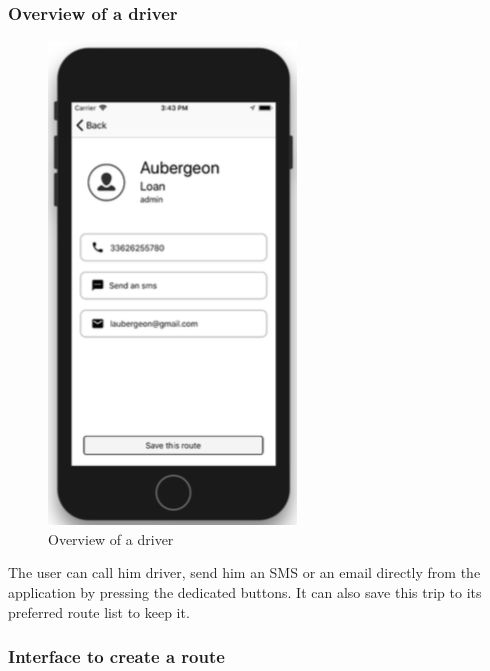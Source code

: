 \subsubsection{Overview of a driver}

\begin{figure}[h!]
\begin{center}
\includegraphics[scale = 0.3]{diagrams/OverviewDriver.png} 
\end{center}
\caption{Overview of a driver}
\end{figure}

The user can call him driver, send him an SMS or an email directly from the application by pressing the dedicated buttons. It can also save this trip to its preferred route list to keep it.


\subsubsection{Interface to create a route}

